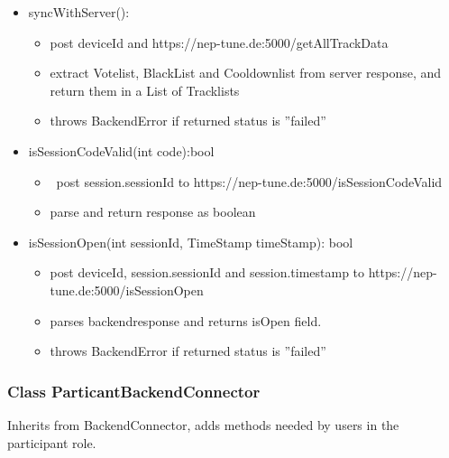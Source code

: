 \documentclass[oneside, ngerman]{sdqtechreport}
\begin{document}
\begin{itemize}
     \item syncWithServer():
     \begin{itemize}
         \item post deviceId and https://nep-tune.de:5000/getAllTrackData
         \item extract Votelist, BlackList and Cooldownlist from server response, and 
         return them in a List of Tracklists 
         \item throws BackendError if returned status is ''failed''
     \end{itemize}
     \item isSessionCodeValid(int code):bool
     \begin{itemize}
         \item \ post session.sessionId to https://nep-tune.de:5000/isSessionCodeValid
         \item parse and return response as boolean
     \end{itemize}
     \item isSessionOpen(int sessionId, TimeStamp timeStamp): bool
     \begin{itemize}
         \item post deviceId, session.sessionId and session.timestamp to https://nep-tune.de:5000/isSessionOpen
         \item parses backendresponse and returns isOpen field. 
         \item throws BackendError if returned status is ''failed'' 
     \end{itemize}
 \end{itemize}

 \subsubsection{Class ParticantBackendConnector}
Inherits from BackendConnector, adds methods needed by users in the participant role.
\end{document}
